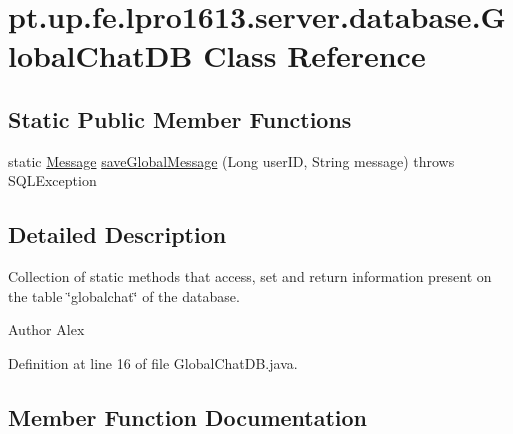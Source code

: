 \hypertarget{classpt_1_1up_1_1fe_1_1lpro1613_1_1server_1_1database_1_1_global_chat_d_b}{}\section{pt.\+up.\+fe.\+lpro1613.\+server.\+database.\+Global\+Chat\+DB Class Reference}
\label{classpt_1_1up_1_1fe_1_1lpro1613_1_1server_1_1database_1_1_global_chat_d_b}
\subsection*{Static Public Member Functions}
\begin{DoxyCompactItemize}
\item 
static \hyperlink{classpt_1_1up_1_1fe_1_1lpro1613_1_1sharedlib_1_1structs_1_1_message}{Message} \hyperlink{classpt_1_1up_1_1fe_1_1lpro1613_1_1server_1_1database_1_1_global_chat_d_b_a15e0bde1ec58cad9c518731db3074105}{save\+Global\+Message} (Long user\+ID, String message)  throws S\+Q\+L\+Exception 
\end{DoxyCompactItemize}


\subsection{Detailed Description}
Collection of static methods that access, set and return information present on the table \char`\"{}globalchat\char`\"{} of the database.

\begin{DoxyAuthor}{Author}
Alex 
\end{DoxyAuthor}


Definition at line 16 of file Global\+Chat\+D\+B.\+java.



\subsection{Member Function Documentation}
\hypertarget{classpt_1_1up_1_1fe_1_1lpro1613_1_1server_1_1database_1_1_global_chat_d_b_a15e0bde1ec58cad9c518731db3074105}{}\label{classpt_1_1up_1_1fe_1_1lpro1613_1_1server_1_1database_1_1_global_chat_d_b_a15e0bde1ec58cad9c518731db3074105} 

